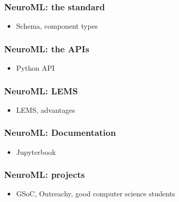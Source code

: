 \begin{frame}[c]
  \frametitle{NeuroML: the standard}
  \begin{itemize}
    \item Schema, component types
  \end{itemize}
\end{frame}
\begin{frame}[c]
  \frametitle{NeuroML: the APIs}
  \begin{itemize}
    \item Python API
  \end{itemize}
\end{frame}
\begin{frame}[c]
  \frametitle{NeuroML: LEMS}
  \begin{itemize}
    \item LEMS, advantages
  \end{itemize}
\end{frame}
\begin{frame}[c]
  \frametitle{NeuroML: Documentation}
  \begin{itemize}
    \item Jupyterbook
  \end{itemize}
\end{frame}
\begin{frame}[c]
  \frametitle{NeuroML: projects}
  \begin{itemize}
    \item GSoC, Outreachy, good computer science students
  \end{itemize}
\end{frame}

